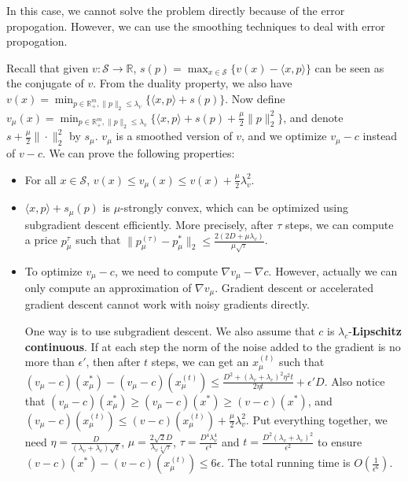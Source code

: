 \documentclass{article}
\begin{document}
In this case, we cannot solve the problem directly because of the error propogation. However, we can use the smoothing techniques to deal with error propogation.

Recall that given $v:\mathcal{S}\rightarrow \mathbb{R}$, $s(p)=\max_{x\in \mathcal{S}}\{v(x)-\langle x,p\rangle\}$ can be seen as the conjugate of $v$. From the duality property, we also have $v(x)=\min_{p\in \mathbb{R}_+^m,\|p\|_2\le\lambda_v}\{\langle x,p\rangle+s(p)\}$. Now define $v_{\mu}(x)=\min_{p\in \mathbb{R}_+^m,\|p\|_2\le\lambda_v}\{\langle x,p\rangle+s(p)+\frac{\mu}{2}\|p\|_2^2\}$, and denote $s+\frac{\mu}{2}\|\cdot\|_2^2$ by $s_{\mu}$. $v_{\mu}$ is a smoothed version of $v$, and we optimize $v_{\mu}-c$ instead of $v-c$. We can prove the following properties:
\begin{itemize}
    \item For all $x\in \mathcal{S}$, $v(x)\le v_{\mu}(x)\le v(x)+\frac{\mu}{2}\lambda_v^2$.
    \item $\langle x,p\rangle+s_{\mu}(p)$ is $\mu$-strongly convex, which can be optimized using subgradient descent efficiently. More precisely, after $\tau$ steps, we can compute a price $p_{\mu}^{\tau}$ such that $\|p_{\mu}^{(\tau)}-p_{\mu}^*\|_2\le \frac{2(2D+\mu\lambda_v)}{\mu\sqrt{\tau}}$.
    \item To optimize $v_{\mu}-c$, we need to compute $\nabla v_{\mu}-\nabla c$. However, actually we can only compute an approximation of $\nabla v_{\mu}$. Gradient descent or accelerated gradient descent cannot work with noisy gradients directly.

    One way is to use subgradient descent. We also assume that $c$ is $\lambda_c$-\textbf{Lipschitz continuous}. If at each step the norm of the noise added to the gradient is no more than $\epsilon'$, then after $t$ steps, we can get an $x_{\mu}^{(t)}$ such that $(v_{\mu}-c)(x_{\mu}^*)-(v_{\mu}-c)(x_{\mu}^{(t)})\le \frac{D^2+(\lambda_v+\lambda_c)^2\eta^2t}{2\eta t}+\epsilon' D$. Also notice that $(v_{\mu}-c)(x_{\mu}^*)\ge(v_{\mu}-c)(x^*)\ge(v-c)(x^*)$, and $(v_{\mu}-c)(x_{\mu}^{(t)})\le (v-c)(x_{\mu}^{(t)})+\frac{\mu}{2}\lambda_v^2$. Put everything together, we need $\eta=\frac{D}{(\lambda_v+\lambda_c)\sqrt{t}}$, $\mu=\frac{2\sqrt{2}D}{\lambda_v\sqrt[4]{\tau}}$, $\tau=\frac{D^4\lambda_v^4}{\epsilon^4}$ and $t=\frac{D^2(\lambda_v+\lambda_c)^2}{\epsilon^2}$ to ensure $(v-c)(x^*)-(v-c)(x_{\mu}^{(t)})\le6\epsilon$. The total running time is $O\left(\frac{1}{\epsilon^6}\right)$.
\end{itemize}
\end{document}
